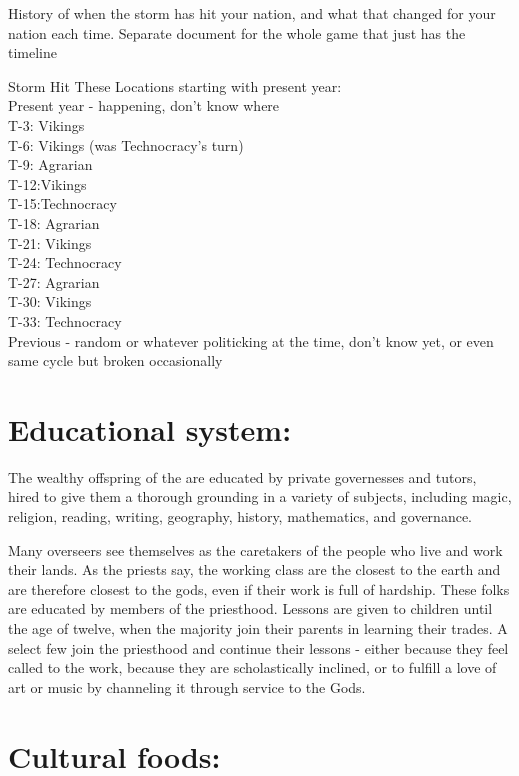 \documentclass[blue]{GL2020}
\begin{document}
History of when the storm has hit your nation, and what that changed for your nation each time.
Separate document for the whole game that just has the timeline

Storm Hit These Locations starting with present year:\\
Present year - happening, don’t know where\\
T-3: Vikings\\
T-6: Vikings (was Technocracy’s turn)\\
T-9: Agrarian\\
T-12:Vikings\\
T-15:Technocracy\\
T-18: Agrarian\\
T-21: Vikings\\
T-24: Technocracy\\
T-27: Agrarian\\
T-30: Vikings\\
T-33: Technocracy\\
Previous - random or whatever politicking at the time, don’t know yet, or even same cycle but broken occasionally\\

\section*{Educational system:}

The wealthy offspring of the \pSunCh{} are educated by private governesses and tutors, hired to give them a thorough grounding in a variety of subjects, including magic, religion, reading, writing, geography, history, mathematics, and governance.

Many overseers see themselves as the caretakers of the people who live and work their lands.  As the priests say, the working class are the closest to the earth and are therefore closest to the gods, even if their work is full of hardship.  These folks are educated by members of the priesthood.  Lessons are given to children until the age of twelve, when the majority join their parents in learning their trades.  A select few join the priesthood and continue their lessons - either because they feel called to the work, because they are scholastically inclined, or to fulfill a love of art or music by channeling it through service to the Gods.

\section*{Cultural foods:}
\end{document}
